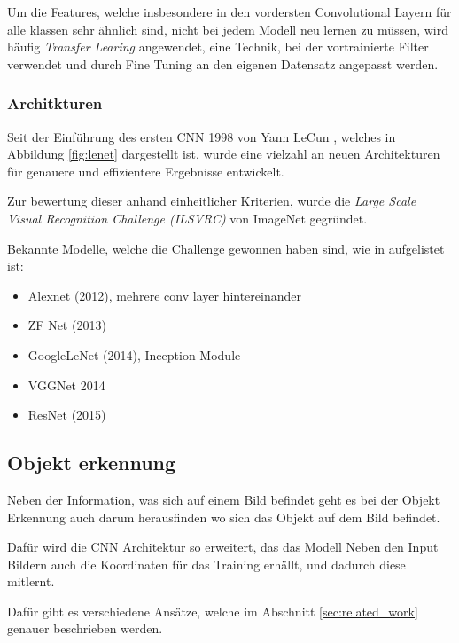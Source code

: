 Um die Features, welche insbesondere in den vordersten Convolutional 
Layern für alle klassen sehr ähnlich sind, nicht bei jedem Modell
neu lernen zu müssen, wird häufig \textit{Transfer Learing} angewendet, 
eine Technik, bei der vortrainierte Filter verwendet und durch Fine 
Tuning an den eigenen Datensatz angepasst werden.


\subsubsection{Architkturen}\label{subsubsec:architecture}

Seit der Einführung des ersten CNN 1998 von Yann LeCun
\cite{lecunGradientBasedLearningApplied1998}, welches in 
Abbildung \ref{fig:lenet} dargestellt ist, wurde eine 
vielzahl an neuen Architekturen für genauere und effizientere
Ergebnisse entwickelt.

Zur bewertung dieser anhand einheitlicher Kriterien,
wurde die \textit{Large Scale Visual Recognition Challenge (ILSVRC)}
\cite{ImageNetLargeScale} von ImageNet gegründet.

Bekannte Modelle, welche die Challenge gewonnen haben 
sind, wie in \cite{StanfordCS231nConvolutional} aufgelistet ist:


\begin{itemize}
    \item Alexnet (2012), mehrere conv layer hintereinander
    \item ZF Net (2013)
    \item GoogleLeNet (2014), Inception Module
    \item VGGNet 2014
    \item ResNet (2015)
\end{itemize}



\subsection{Objekt erkennung}\label{subsec:objdet_det}

Neben der Information, was sich auf einem Bild befindet geht 
es bei der Objekt Erkennung auch darum herausfinden wo sich das 
Objekt auf dem Bild befindet.

Dafür wird die CNN Architektur so erweitert, das das Modell 
Neben den Input Bildern auch die Koordinaten für das 
Training erhällt, und dadurch diese mitlernt.

Dafür gibt es verschiedene Ansätze, welche im Abschnitt \ref{sec:related_work}
genauer beschrieben werden.

